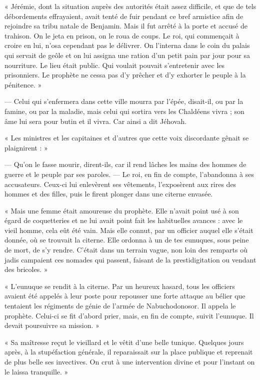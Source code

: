 \documentclass[a4paper, 11pt, oneside, polutonikogreek, french]{article}
\begin{document}
« Jérémie, dont la situation auprès des autorités était assez difficile, et que de tels débordements effrayaient, avait tenté de fuir pendant ce bref armistice afin de rejoindre sa tribu natale de Benjamin. Mais il fut arrêté à la porte et accusé de trahison. On le jeta en prison, on le roua de coups. Le roi, qui commençait à croire en lui, n'osa cependant pas le délivrer. On l'interna dans le coin du palais qui servait de geôle et on lui assigna une ration d'un petit pain par jour pour sa nourriture. Le lieu était public. Qui voulait pouvait s'entretenir avec les prisonniers. Le prophète ne cessa pas d'y prêcher et d'y exhorter le peuple à la pénitence. »

--- Celui qui s'enfermera dans cette ville mourra par l'épée, disait-il, ou par la famine, ou par la maladie, mais celui qui sortira vers les Chaldéens vivra ; son âme lui sera pour butin et il vivra. Car ainsi a dit Jéhovah.

« Les ministres et les capitaines et d'autres que cette voix discordante gênait se plaignirent : »

--- Qu'on le fasse mourir, dirent-ils, car il rend lâches les mains des hommes de guerre et le peuple par ses paroles. --- Le roi, en fin de compte, l'abandonna à ses accusateurs. Ceux-ci lui enlevèrent ses vêtements, l'exposèrent aux rires des hommes et des filles, puis le firent plonger dans une citerne envasée.

« Mais une femme était amoureuse du prophète. Elle n'avait point usé à son égard de coquetteries et ne lui avait point fait les habituelles avances : avec le vieil homme, cela eût été vain. Mais elle connut, par un officier auquel elle s'était donnée, où se trouvait la citerne. Elle ordonna à un de tes eunuques, sous peine de mort, de s'y rendre. C'était dans un terrain vague, non loin des remparts où jadis campaient ces nomades qui passent, faisant de la prestidigitation ou vendant des bricoles. »

« L'eunuque se rendit à la citerne. Par un heureux hasard, tous les officiers avaient été appelés à leur poste pour repousser une forte attaque au bélier que tentaient les régiments de génie de l'armée de Nabuchodonosor. Il appela le prophète. Celui-ci se fit d'abord prier, mais, en fin de compte, suivit l'eunuque. Il devait poursuivre sa mission. »

« Sa maîtresse reçut le vieillard et le vêtit d'une belle tunique. Quelques jours après, à la stupéfaction générale, il reparaissait sur la place publique et reprenait de plus belle ses invectives. On crut à une intervention divine et pour l'instant on le laissa tranquille. »
\end{document}
